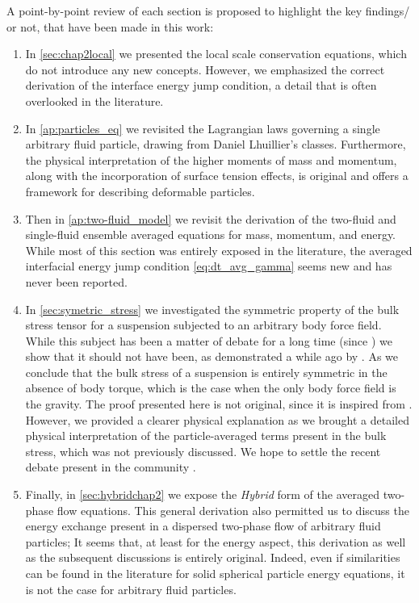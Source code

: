 A point-by-point review of each section is proposed to highlight the key findings/ or not, that have been made in this work: 
\begin{enumerate}
    \item  In \ref{sec:chap2local} we presented the local scale conservation equations, which do not introduce any new concepts. 
    However, we emphasized the correct derivation of the interface energy jump condition, a detail that is often overlooked in the literature. 
    \item In \ref{ap:particles_eq} we revisited the Lagrangian laws governing a single arbitrary fluid particle, drawing from Daniel Lhuillier's classes. 
    Furthermore, the physical interpretation of the higher moments of mass and momentum, along with the incorporation of surface tension effects, is original and offers a framework for describing deformable particles. 
    \item Then in \ref{ap:two-fluid_model} we revisit the derivation of the two-fluid and single-fluid ensemble averaged equations for mass, momentum, and energy. 
    While most of this section was entirely exposed in the literature, the averaged interfacial energy jump condition \eqref{eq:dt_avg_gamma} seems new and has never been reported.
    \item In \ref{sec:symetric_stress} we investigated the symmetric property of the bulk stress tensor for a suspension subjected to an arbitrary body force field. 
    While this subject has been a matter of debate for a long time (since \citet{prosperetti2006stress}) we show that it should not have been, as demonstrated a while ago by \citet{lhuillier1996contribution}.
    As \citet{lhuillier1996contribution} we conclude that the bulk stress of a suspension is entirely symmetric in the absence of body torque, which is the case when the only body force field is the gravity. 
    The proof presented here is not original, since it is inspired from \citet{lhuillier1996contribution}.
    However, we provided a clearer physical explanation as we brought a detailed physical interpretation of the particle-averaged terms present in the bulk stress, which was not previously discussed.
    We hope to settle the recent debate present in the community \citep{dolata2020heterogeneous,zhou2020lamb}. 
    \item Finally, in \ref{sec:hybridchap2} we expose the \textit{Hybrid} form of the averaged two-phase flow equations. 
    This general derivation also permitted us to discuss the energy exchange present in a dispersed two-phase flow of arbitrary fluid particles; 
    It seems that, at least for the energy aspect, this derivation as well as the subsequent discussions is entirely original. 
    Indeed, even if similarities can be found in the literature for solid spherical particle energy equations, it is not the case for arbitrary fluid particles. 
\end{enumerate}


